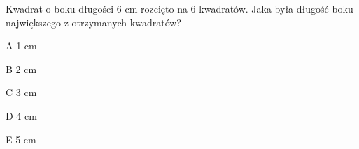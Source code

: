 \begin{tresc}
Kwadrat o boku długości 6 cm rozcięto na 6 kwadratów. Jaka była długość boku największego z otrzymanych kwadratów?
\end{tresc}
\begin{wariant}{A} 1 cm \end{wariant}
\begin{wariant}{B} 2 cm \end{wariant}
\begin{wariant}{C} 3 cm \end{wariant}
\begin{wariant}{D} 4 cm \end{wariant}
\begin{wariant}{E} 5 cm \end{wariant}
